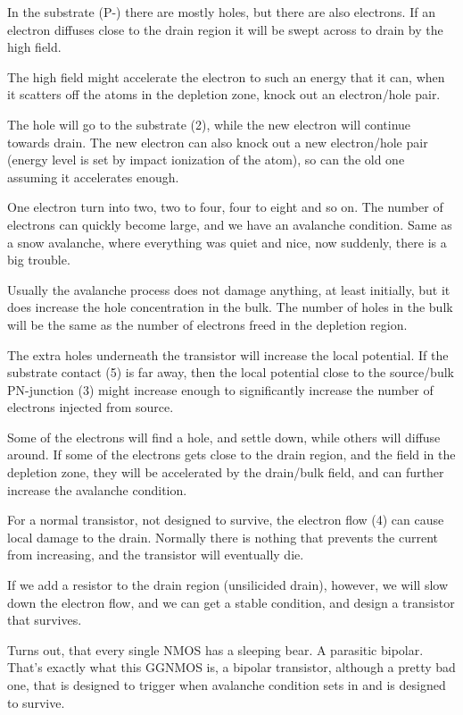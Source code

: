 In the substrate (P-) there are mostly holes, but there are also
electrons. If an electron diffuses close to the drain region it will be
swept across to drain by the high field.

The high field might accelerate the electron to such an energy that it
can, when it scatters off the atoms in the depletion zone, knock out an
electron/hole pair.

The hole will go to the substrate (2), while the new electron will
continue towards drain. The new electron can also knock out a new
electron/hole pair (energy level is set by impact ionization of the
atom), so can the old one assuming it accelerates enough.

One electron turn into two, two to four, four to eight and so on. The
number of electrons can quickly become large, and we have an avalanche
condition. Same as a snow avalanche, where everything was quiet and
nice, now suddenly, there is a big trouble.

Usually the avalanche process does not damage anything, at least
initially, but it does increase the hole concentration in the bulk. The
number of holes in the bulk will be the same as the number of electrons
freed in the depletion region.

The extra holes underneath the transistor will increase the local
potential. If the substrate contact (5) is far away, then the local
potential close to the source/bulk PN-junction (3) might increase enough
to significantly increase the number of electrons injected from source.

Some of the electrons will find a hole, and settle down, while others
will diffuse around. If some of the electrons gets close to the drain
region, and the field in the depletion zone, they will be accelerated by
the drain/bulk field, and can further increase the avalanche condition.

For a normal transistor, not designed to survive, the electron flow (4)
can cause local damage to the drain. Normally there is nothing that
prevents the current from increasing, and the transistor will eventually
die.

If we add a resistor to the drain region (unsilicided drain), however,
we will slow down the electron flow, and we can get a stable condition,
and design a transistor that survives.

Turns out, that every single NMOS has a sleeping bear. A parasitic
bipolar. That's exactly what this GGNMOS is, a bipolar transistor,
although a pretty bad one, that is designed to trigger when avalanche
condition sets in and is designed to survive.

